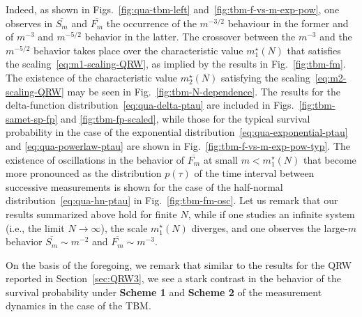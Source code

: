 \documentclass[12pt]{iopart}
\begin{document}
Indeed, as shown in Figs.~\ref{fig:qua-tbm-left} and~\ref{fig:tbm-f-vs-m-exp-pow}, one observes in $\overline{S_m}$ and $\overline{F_m}$ the occurrence of the $m^{-3/2}$ behaviour in the former and of $m^{-3}$ and $m^{-5/2}$ behavior in the latter.  The crossover between the $m^{-3}$ and the $m^{-5/2}$ behavior takes place over the characteristic value $m_1^\star(N)$ that satisfies the scaling~\eqref{eq:m1-scaling-QRW}, as implied by the results in Fig.~\ref{fig:tbm-fm}.  The existence of the characteristic value $m_2^\star(N)$ satisfying the scaling~\eqref{eq:m2-scaling-QRW} may be seen in Fig.~\ref{fig:tbm-N-dependence}.  The results for the delta-function distribution~\eqref{eq:qua-delta-ptau} are included in Figs.~\ref{fig:tbm-samet-sp-fp} and \ref{fig:tbm-fp-scaled}, while those for the typical survival probability in the case of the exponential distribution~\eqref{eq:qua-exponential-ptau} and \eqref{eq:qua-powerlaw-ptau} are shown in Fig.~\ref{fig:tbm-f-vs-m-exp-pow-typ}.  The existence of oscillations in the behavior of $\overline{F_m}$ at small $m < m_1^\star(N)$ that become more pronounced as the distribution $p(\tau)$ of the time interval between successive measurements is shown for the case of the half-normal distribution~\eqref{eq:qua-hn-ptau} in Fig.~\ref{fig:tbm-fm-osc}.  Let us remark that our results summarized above hold for finite $N$,  while if one studies an infinite system (i.e., the limit $N \to\infty$), the scale $m_1^\star(N)$ diverges, and one observes the large-$m$ behavior $\overline{S_m} \sim m^{-2}$ and $\overline{F_m} \sim m^{-3}$.

On the basis of the foregoing, we remark that similar to the results for the QRW reported in Section~\ref{sec:QRW3}, we see a stark
contrast in the behavior of the survival probability under {\bf Scheme
1} and {\bf Scheme 2} of the measurement dynamics in the case of the TBM.
\end{document}

